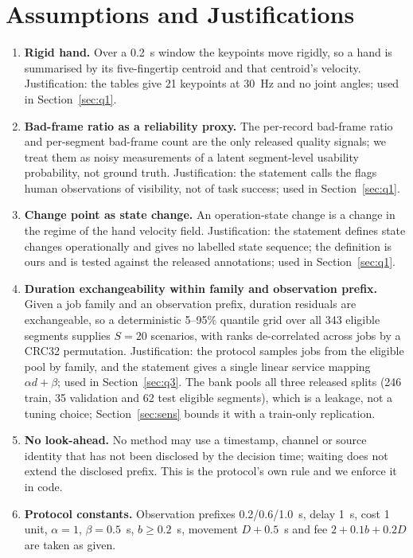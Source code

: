 \documentclass{swmcmthesis}
\begin{document}
\section{Assumptions and Justifications}
\begin{enumerate}
  \item \textbf{Rigid hand.} Over a 0.2~s window the keypoints move rigidly, so a hand is summarised by its five-fingertip centroid and that centroid's velocity. Justification: the tables give 21 keypoints at 30~Hz and no joint angles; used in Section~\ref{sec:q1}.
  \item \textbf{Bad-frame ratio as a reliability proxy.} The per-record bad-frame ratio and per-segment bad-frame count are the only released quality signals; we treat them as noisy measurements of a latent segment-level usability probability, not ground truth. Justification: the statement calls the flags human observations of visibility, not of task success; used in Section~\ref{sec:q1}.
  \item \textbf{Change point as state change.} An operation-state change is a change in the regime of the hand velocity field. Justification: the statement defines state changes operationally and gives no labelled state sequence; the definition is ours and is tested against the released annotations; used in Section~\ref{sec:q1}.
  \item \textbf{Duration exchangeability within family and observation prefix.} Given a job family and an observation prefix, duration residuals are exchangeable, so a deterministic 5--95\% quantile grid over all 343 eligible segments supplies $S=20$ scenarios, with ranks de-correlated across jobs by a CRC32 permutation. Justification: the protocol samples jobs from the eligible pool by family, and the statement gives a single linear service mapping $\alpha d+\beta$; used in Section~\ref{sec:q3}. The bank pools all three released splits (246 train, 35 validation and 62 test eligible segments), which is a leakage, not a tuning choice; Section~\ref{sec:sens} bounds it with a train-only replication.
  \item \textbf{No look-ahead.} No method may use a timestamp, channel or source identity that has not been disclosed by the decision time; waiting does not extend the disclosed prefix. This is the protocol's own rule and we enforce it in code.
  \item \textbf{Protocol constants.} Observation prefixes 0.2/0.6/1.0~s, delay 1~s, cost 1 unit, $\alpha=1$, $\beta=0.5$~s, $b\ge0.2$~s, movement $D+0.5$~s and fee $2+0.1b+0.2D$ are taken as given.
\end{enumerate}
\end{document}
